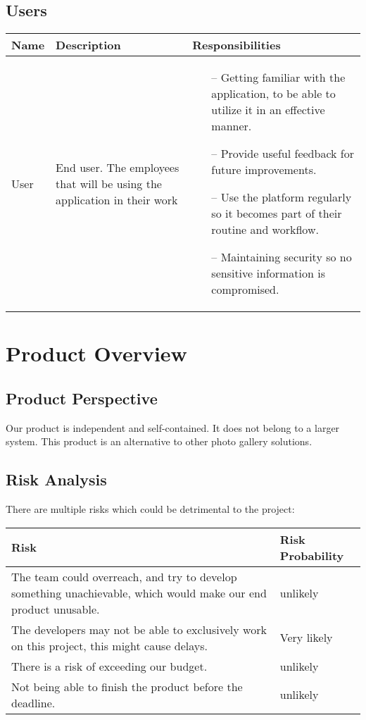 \documentclass{article}
\begin{document}
\subsection{Users}
\begin{tabularx}{1.0\textwidth} { 
  | >{\raggedright\arraybackslash}X 
  | >{\raggedright\arraybackslash}X
  | >{\raggedright\arraybackslash}X | }
    \hline
    \rowcolor{lightgray} Name & Description & Responsibilities \\
    \hline
    User & End user. The employees that will be using the application in their work & \begin{itemize}
        \item[--] Getting familiar with the application, to be able to utilize it in an effective manner.
        \item[--] Provide useful feedback for future improvements.
        \item[--] Use the platform regularly so it becomes part of their routine and workflow.
        \item[--] Maintaining security so no sensitive information is compromised.
    \end{itemize}{} \\
    \hline
\end{tabularx}


\section{Product Overview}
\subsection{Product Perspective}
Our product is independent and self-contained. It does not belong to a larger system. This product is an alternative to other photo gallery solutions. 
\subsection{Risk Analysis}
There are multiple risks which could be detrimental to the project: 


\begin{tabularx}{1.0\textwidth} {
  | >{\raggedright\arraybackslash}X
  | >{\raggedright\arraybackslash}X | }
    \hline
    \rowcolor{lightgray} Risk & Risk Probability \\
    \hline
    The team could overreach, and try to develop something unachievable, which would make our end product unusable. & unlikely \\
    \hline
    The developers may not be able to exclusively work on this project, this might cause delays. & Very likely \\
    \hline
    There is a risk of exceeding our budget. & unlikely \\
    \hline
    Not being able to finish the product before the deadline. & unlikely \\
    \hline
\end{tabularx}
\end{document}
